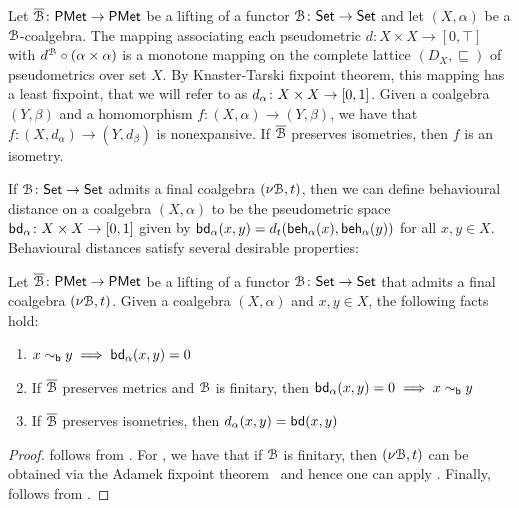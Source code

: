 \begin{lemma}\label{c2:lem:behavioural_distances}
	Let $\overline{\mathcal{B}} \colon \mathsf{PMet} \to \mathsf{PMet}$ be a lifting of a functor $\mathcal{B} \colon {\mathsf{Set}} \to {\mathsf{Set}}$ and let $(X, \alpha)$ be a $\mathcal{B}$-coalgebra. The mapping associating each pseudometric $d \colon X \times X \to [0,\top]$ with $d^{\mathcal{B}} \circ (\alpha \times \alpha)$ is a monotone mapping on the complete lattice $(D_X, \sqsubseteq)$ of pseudometrics over set $X$. By Knaster-Tarski fixpoint theorem, this mapping has a least fixpoint, that we will refer to as $d_\alpha \colon X \times X \to \interval{0}{1}$. Given a coalgebra $(Y, \beta)$ and a homomorphism $f \colon (X, \alpha) \to (Y, \beta)$, we have that $f \colon (X, d_\alpha) \to (Y, d_\beta)$ is nonexpansive. If $\overline{\mathcal{B}}$ preserves isometries, then $f$ is an isometry.
\end{lemma}
If $\mathcal{B} \colon {\mathsf{Set}} \to {\mathsf{Set}}$ admits a final coalgebra $(\nu \mathcal{B}, t)$, then we can define behavioural distance on a  coalgebra $(X, \alpha)$ to be the pseudometric space $\bd_\alpha \colon X\times X \to \interval{0}{1}$ given by $\mathsf{bd}_\alpha(x,y) = d_{t}(\mathsf{beh}_{\alpha}(x), \mathsf{beh}_{\alpha}(y))$ for all $x, y \in X$. Behavioural distances satisfy several desirable properties:
\begin{lemma}\label{c2:lem:behavioural_distances_properties}
	Let $\overline{\mathcal{B}} \colon \mathsf{PMet} \to \mathsf{PMet}$ be a lifting of a functor $\mathcal{B} \colon {\mathsf{Set}} \to {\mathsf{Set}}$ that admits a final coalgebra $(\nu \mathcal{B}, t)$. Given a coalgebra $(X, \alpha)$ and $x,y \in X$, the following facts hold:
	\begin{enumerate}
		\item $x \sim_{\mathsf{b}} y \implies \mathsf{bd}_\alpha(x,y)=0$
		\item If $\overline{\mathcal{B}}$ preserves metrics and $\mathcal{B}$ is finitary, then $\mathsf{bd}_\alpha(x,y)=0 \implies x \sim_{\mathsf{b}} y$
		\item If $\overline{\mathcal{B}}$ preserves isometries, then $d_\alpha(x,y) = \mathsf{bd}(x,y)$
	\end{enumerate}
\end{lemma}
\begin{proof}
	 follows from \cite[Lemma~6.6]{Baldan:2018:Coalgebraic}. For , we have that if $\mathcal{B}$ is finitary, then $(\nu \mathcal{B},t)$ can be obtained via the Adamek fixpoint theorem~\cite{Adamek:1995:Greatest} and hence one can apply \cite[Theorem~6.10]{Baldan:2018:Coalgebraic}. Finally,  follows from \cite[Theorem~6.7]{Baldan:2018:Coalgebraic}.
\end{proof}
